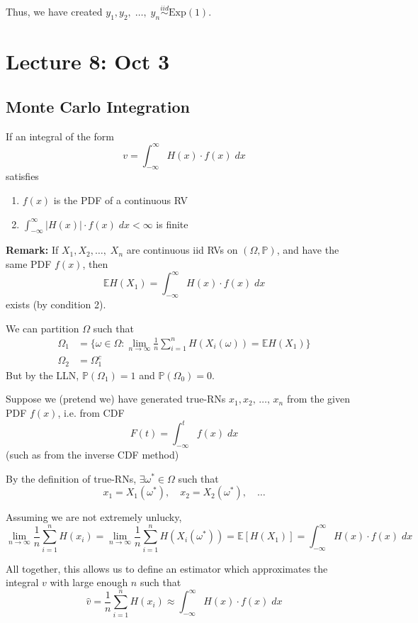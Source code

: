 \documentclass[12pt]{article}
\renewcommand{\hat}[1]{\widehat{#1}}
\renewcommand{\P}{\mathbb{P}}
\newcommand{\E}{\mathbb{E}}
\newcommand{\ellipsis}{\; \dots, \;}
\begin{document}
Thus, we have created $y_1, y_2, \ellipsis y_n \overset{iid}{\sim} \text{Exp}(1)$.

\section{Lecture 8: Oct 3}
\subsection{Monte Carlo Integration}
If an integral of the form 
\[v = \int_{-\infty}^{\infty} H(x) \cdot f(x)\; dx\]
satisfies 
\begin{enumerate}
    \item $f(x)$ is the PDF of a continuous RV
    \item $\int_{-\infty}^{\infty} \big\vert H(x) \big\vert \cdot f(x)\; dx < \infty$ is finite
\end{enumerate}

\textbf{Remark:} If $X_1, X_2, \dots,\; X_n$ are continuous iid RVs on $(\Omega, \P)$, and have the same PDF $f(x)$, then 
\[\E H(X_1) = \int_{-\infty}^{\infty} H(x) \cdot f(x)\; dx\]
exists (by condition 2).

We can partition $\Omega$ such that 
\begin{align*}
    \Omega_1 &= \{\omega \in \Omega: \lim_{n\to \infty} \frac{1}{n}\sum_{i=1}^n H(X_i(\omega)) = \E H(X_1)\}\\
    \Omega_2 &= \Omega_1^c
\end{align*}
But by the LLN, $\P(\Omega_1) = 1$ and $\P(\Omega_0) = 0$.

Suppose we (pretend we) have generated true-RNs $x_1, x_2, \, \dots,\, x_n$ from the given PDF $f(x)$, i.e. from CDF 
\[F(t) = \int_{-\infty}^t f(x)\; dx\]
(such as from the inverse CDF method) 

By the definition of true-RNs, $\exists \omega^* \in \Omega$ such that
\[x_1 = X_1(\omega^*), \quad x_2 = X_2(\omega^*), \quad \dots\]

Assuming we are not extremely unlucky, 
\[\lim_{n\to \infty} \frac{1}{n}\sum_{i=1}^n H(x_i) = \lim_{n\to \infty} \frac{1}{n}\sum_{i=1}^n H(X_i(\omega^*)) = \E[H(X_1)] = \int_{-\infty}^{\infty} H(x)\cdot f(x)\; dx\]

All together, this allows us to define an estimator which approximates the integral $v$ with large enough $n$ such that 
\[\boxed{\hat v = \frac{1}{n}\sum_{i=1}^n H(x_i) \approx \int_{-\infty}^{\infty} H(x) \cdot f(x)\; dx}\]
\end{document}

